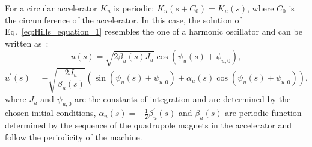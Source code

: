 

For a circular accelerator $K_u$ is periodic: $K_u(s+C_0)=K_u(s)$, where $C_0$ is the circumference of the accelerator. In this case, the solution of Eq.~\eqref{eq:Hills_equation_1} resembles the one of a harmonic oscillator and can be written as~\cite{Lee:1425444}:
\begin{equation}\label{eq:solution_eq_motion_u}
    u(s) = \sqrt{2 \beta_u(s) J_u} \cos{(\psi_u(s)+ \psi_{u,0})},
\end{equation} 
\begin{equation}\label{eq:solution_eq_motion_u_prime}
    u^\prime(s) = - \sqrt{\frac{2 J_u}{\beta_u(s)}} (\sin{(\psi_u(s) + \psi_{u,0})}+\alpha_u(s)\cos{(\psi_u(s)+ \psi_{u,0})}),
\end{equation} 
where $J_u$ and $\psi_{u,0}$ are the constants of integration and are determined by the chosen initial conditions, $\alpha_u(s)=-\frac{1}{2} \beta^\prime_u(s)$ and $\beta_u(s)$ are periodic function determined by the sequence of the quadrupole magnets in the accelerator and follow the periodicity of the machine. %
